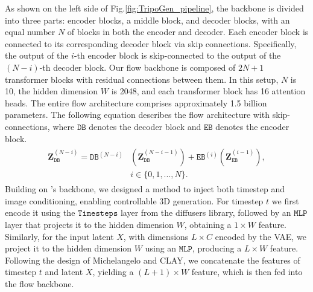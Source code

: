 As shown on the left side of Fig.\ref{fig:TripoGen_pipeline}, the backbone is divided into three parts: encoder blocks, a middle block, and decoder blocks, with an equal number $N$ of blocks in both the encoder and decoder. Each encoder block is connected to its corresponding decoder block via skip connections. Specifically, the output of the $i$-th encoder block is skip-connected to the output of the $(N-i)$-th decoder block.
Our flow backbone is composed of $2N+1$ transformer blocks with residual connections between them. In this setup, $N$ is 10, the hidden dimension $W$ is 2048, and each transformer block has 16 attention heads.
The entire flow architecture comprises approximately 1.5 billion parameters.
The following equation describes the flow architecture with skip-connections, where $\mathtt{DB}$ denotes the decoder block and $\mathtt{EB}$ denotes the encoder block.
\begin{gather}
\begin{aligned}
\mathbf{Z}_{\mathtt{DB}}^{\left(N-i\right)}=\mathtt{{DB}}^{\left(N-i\right)}&\left(\mathbf{Z}_{\mathtt{DB}}^{\left(N-i-1\right)}\right) + \mathtt{EB}^{\left(i\right)}\left(\mathbf{Z}_{\mathtt{EB}}^{\left(i-1\right)}\right), \\
&i \in \{0,1,...,N\}.
\end{aligned}
\end{gather}
Building on \method{}'s backbone, we designed a method to inject both timestep and image conditioning, enabling controllable 3D generation. For timestep $t$ we first encode it using the $\mathtt{Timesteps}$ layer from the diffusers library\cite{von-platen-etal-2022-diffusers}, followed by an $\mathtt{MLP}$ layer that projects it to the hidden dimension $W$, obtaining a $1 \times W$ feature. 
Similarly, for the input latent $X$, with dimensions $L\times C$ encoded by the VAE, we project it to the hidden dimension $W$ using an $\mathtt{MLP}$, producing a $L\times W$ feature. Following the design of Michelangelo\cite{zhao2024michelangelo} and CLAY\cite{zhang2024clay}, we concatenate the features of timestep $t$ and latent $X$, yielding a $(L+1) \times W$ feature, which is then fed into the flow backbone.

